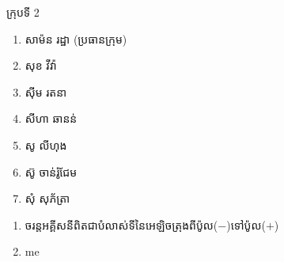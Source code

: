 \documentclass[15pt,a4paper]{article}
\author{james1}
\date{\today}
\newenvironment{kfont}{\khfont}{}
\begin{document}
\hfill\begin{minipage}{0.2\linewidth}
\begin{kfont}ក្រុបទី\end{kfont} 2
\begin{enumerate}
\item \begin{kfont}សាម៉ន រដ្ឋា (ប្រធានក្រុម)\end{kfont}
\item \begin{kfont}សុខ វីវ៉ា\end{kfont}
\item \begin{kfont}សុីម រតនា\end{kfont}
\item \begin{kfont}សីហា ឆានន់\end{kfont}
\item \begin{kfont}សូ លីហុង\end{kfont}
\item \begin{kfont}ស៊ូ ចាន់រ៉ូជែម\end{kfont}
\item \begin{kfont}សុំ សុភ័ត្រា\end{kfont}
\end{enumerate}
\end{minipage}
\begin{enumerate}
\item 
\begin{kfont}
ចរន្តអគ្គីសនីពិតជាបំលាស់ទីនៃអេឡិចត្រុងពីប៉ូល(\(-\))ទៅប៉ូល(\(+\))
\end{kfont}
\item 
me
\end{enumerate}
\end{document}
